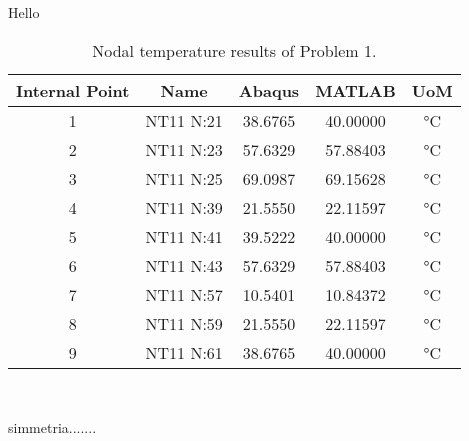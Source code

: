 
Hello 

\begin{table}[H]
    \centering 
    \begin{tabular}{ccccc}
    \hline
    \rowcolor{bluepoli!40} %
    Internal Point & Name & Abaqus & MATLAB & UoM \\
    \hline
    1 & NT11 N:21 & 38.6765 & 40.00000 & °C \\
    2 & NT11 N:23 & 57.6329 & 57.88403 & °C \\
    3 & NT11 N:25 & 69.0987 & 69.15628 & °C \\
    4 & NT11 N:39 & 21.5550 & 22.11597 & °C \\
    5 & NT11 N:41 & 39.5222 & 40.00000 & °C \\
    6 & NT11 N:43 & 57.6329 & 57.88403 & °C \\
    7 & NT11 N:57 & 10.5401 & 10.84372 & °C \\
    8 & NT11 N:59 & 21.5550 & 22.11597 & °C \\
    9 & NT11 N:61 & 38.6765 & 40.00000 & °C \\
    \hline
    \end{tabular}
    \\[10pt]
    \caption{Nodal temperature results of Problem 1.}
    \label{table:stedyRes}
\end{table}

simmetria.......

\newpage

